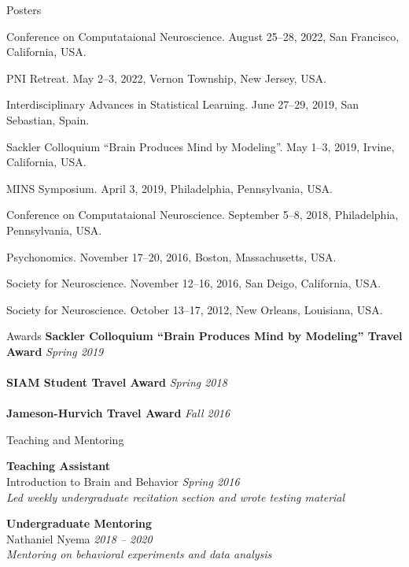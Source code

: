 \documentclass{resume} %
\begin{document}
\begin{rSection}{Posters}
 
Conference on Computataional Neuroscience. August 25--28, 2022, San Francisco, California, USA.

PNI Retreat. May 2--3, 2022, Vernon Township, New Jersey, USA.

Interdisciplinary Advances in Statistical Learning. June 27--29, 2019, San Sebastian, Spain.

Sackler Colloquium ``Brain Produces Mind by Modeling''. May 1--3, 2019, Irvine, California, USA.

MINS Symposium. April 3, 2019, Philadelphia, Pennsylvania, USA.

Conference on Computataional Neuroscience. September 5--8, 2018, Philadelphia, Pennsylvania, USA.

Psychonomics. November 17--20, 2016, Boston, Massachusetts, USA.

Society for Neuroscience. November 12--16, 2016, San Deigo, California, USA.

Society for Neuroscience. October 13--17, 2012, New Orleans, Louisiana, USA.
\end{rSection}

\begin{rSection}{Awards}
    \textbf{Sackler Colloquium ``Brain Produces Mind by Modeling'' Travel Award} \hfill \emph{Spring 2019} \\
    \\
    \textbf{SIAM Student Travel Award} \hfill \emph{Spring 2018} \\
    \\
    \textbf{Jameson-Hurvich Travel Award} \hfill \emph{Fall 2016} \\
\end{rSection}


\begin{rSection}{Teaching and Mentoring}

\textbf{Teaching Assistant} \\
Introduction to Brain and Behavior \hfill \emph{Spring 2016} \\
\emph{Led weekly undergraduate recitation section and wrote testing material}

\textbf{Undergraduate Mentoring} \\
Nathaniel Nyema \hfill \emph{2018 -- 2020} \\
\emph{Mentoring on behavioral experiments and data analysis}
\end{rSection}
\end{document}

